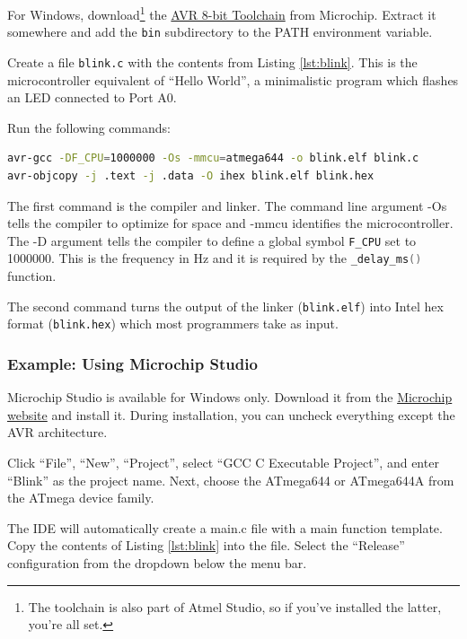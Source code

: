 \documentclass{article}
\newcommand{\file}[1]{\texttt{#1}}
\begin{document}
For Windows, download\footnote{The toolchain is also part of Atmel Studio, so if you've installed the latter, you're all set.} the \href{https://www.microchip.com/en-us/tools-resources/develop/microchip-studio/gcc-compilers/}{AVR 8-bit Toolchain} from Microchip. Extract it somewhere and add the \file{bin} subdirectory to the PATH environment variable. 

Create a file \file{blink.c} with the contents from Listing \ref{lst:blink}. This is the microcontroller equivalent of ``Hello World'', a minimalistic program which flashes an LED connected to Port A0. 



Run the following commands:
\begin{lstlisting}[language=bash]
avr-gcc -DF_CPU=1000000 -Os -mmcu=atmega644 -o blink.elf blink.c
avr-objcopy -j .text -j .data -O ihex blink.elf blink.hex
\end{lstlisting}

The first command is the compiler and linker. The command line argument -Os tells the compiler to optimize for space and -mmcu identifies the microcontroller. The -D argument tells the compiler to define a global symbol \lstinline[language=C]{F_CPU} set to 1000000. This is the frequency in Hz and it is required by the \lstinline[language=C]{_delay_ms()} function. 

The second command turns the output of the linker (\file{blink.elf}) into Intel hex format (\file{blink.hex}) which most programmers take as input. 

\subsubsection{Example: Using Microchip Studio}\label{sec:exMchpStudio}
Microchip Studio is available for Windows only. Download it from the \href{https://www.microchip.com/en-us/tools-resources/develop/microchip-studio#Downloads}{Microchip website} and install it. During installation, you can uncheck everything except the AVR architecture. 

Click ``File'', ``New'', ``Project'', select ``GCC C Executable Project'', and enter ``Blink'' as the project name. Next, choose the ATmega644 or ATmega644A from the ATmega device family. 

The IDE will automatically create a main.c file with a main function template. Copy the contents of Listing \ref{lst:blink} into the file. Select the ``Release'' configuration from the dropdown below the menu bar. 
\end{document}
